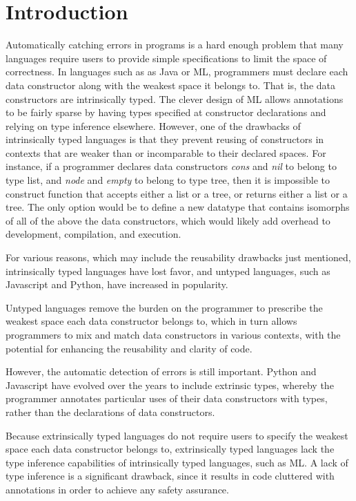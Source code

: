 \documentclass[acmsmall]{acmart}
\theoremstyle{definition}
\begin{document}
\section{Introduction}
\label{sec:introduction}

Automatically catching errors in programs is a hard enough problem
that many languages require users to provide simple specifications to limit the space of correctness.
In languages such as as Java or ML, programmers must declare each data constructor along with the weakest space it belongs to. 
That is, the data constructors are intrinsically typed.
The clever design of ML allows annotations to be fairly sparse by 
having types specified at constructor declarations and relying on type inference elsewhere.
However, one of the drawbacks of intrinsically typed languages is that they prevent reusing of
constructors in contexts that are weaker than or incomparable to their declared spaces. 
For instance, if a programmer declares data constructors \emph{cons} and \emph{nil} to belong to type list,
and \emph{node} and \emph{empty} to belong to type tree, then it is impossible to construct function
that accepts either a list or a tree, or returns either a list or a tree. The only option would be to define
a new datatype that contains isomorphs of all of the above the data constructors, which would 
likely add overhead to development, compilation, and execution.


For various reasons, which may include the reusability drawbacks just mentioned, 
intrinsically typed languages have lost favor,
and untyped languages, 
such as Javascript and Python, have increased in popularity. 

Untyped languages remove the burden on the programmer to prescribe the weakest space each data constructor belongs to, 
which in turn allows programmers to mix and match data constructors in
various contexts, with the potential for enhancing the reusability and clarity of code.

However, the automatic detection of errors is still important. Python and Javascript have 
evolved over the years to include extrinsic types, whereby the programmer annotates particular uses of
their data constructors with types, rather than the declarations of data constructors.
 
Because extrinsically typed languages do not require users to specify the weakest space each data constructor belongs to,
extrinsically typed languages lack the type inference capabilities of intrinsically typed languages, such as ML. 
A lack of type inference is a significant drawback, since it results in code cluttered with annotations in order
to achieve any safety assurance.
\end{document}

